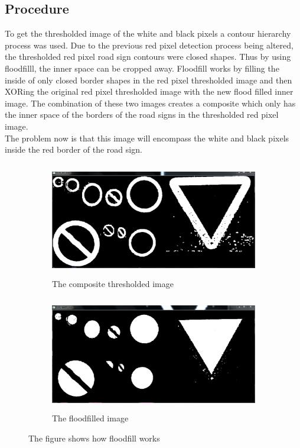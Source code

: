\documentclass{article}
\begin{document}
\subsection{Procedure}\label{sec:intro}
To get the thresholded image of the white and black pixels a contour hierarchy process was used. Due to the previous red pixel detection process being altered, the thresholded red pixel road sign contours were closed shapes. Thus by using floodfilll, the inner space can be cropped away. Floodfill works by filling the inside of only closed border shapes in the red pixel thresholded image and then XORing the original red pixel thresholded image with the new flood filled inner image. The combination of these two images creates a composite which only has the inner space of the borders of the road signs in the thresholded red pixel image.\\
The problem now is that this image will encompass the white and black pixels inside the red border of the road sign. \\
\begin{figure}[H]
\begin{subfigure}{0.5\textwidth}
\includegraphics[width=0.9\linewidth, height=5cm]{N_BIT_AND.PNG} 
\caption{The composite thresholded image}
\label{fig:subim1}
\end{subfigure}
\begin{subfigure}{0.5\textwidth}
\includegraphics[width=0.9\linewidth, height=5cm]{N_WHITE_INV.PNG}
\caption{The floodfilled image}
\label{fig:subim2}
\end{subfigure}
\caption{The figure shows how floodfill works}
\label{fig:image2}
\end{figure}
\end{document}
